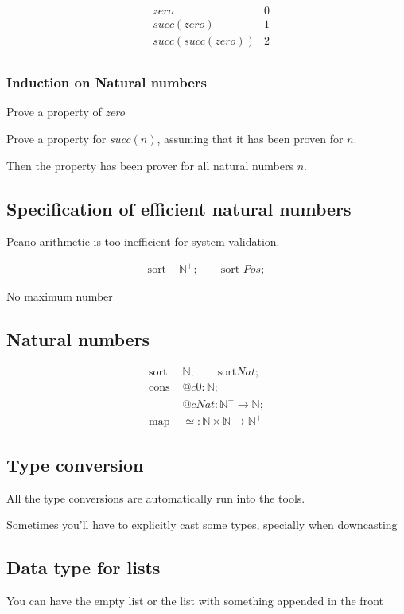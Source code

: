 \begin{align*}
  & zero & 0 \\
  & succ(zero) & 1 \\
  & succ(succ(zero)) & 2 \\
\end{align*}

\subsubsection{Induction on Natural numbers}
Prove a property of \emph{zero}

Prove a property for $succ(n)$, assuming that it has been proven for $n$.

Then the property has been prover for all natural numbers $n$.

\subsection{Specification of efficient natural numbers}

Peano arithmetic is too inefficient for system validation.

\begin{align*}
  \text{sort } & \mathbb{N}^+; \qquad \text{sort } Pos;
\end{align*}

No maximum number

\subsection{Natural numbers}

\begin{align*}
  \text{sort } & \mathbb{N}; \qquad \text{sort} Nat; \\
  \text{cons } & @c0: \mathbb{N}; \\
  & @cNat: \mathbb{N}^+ \rightarrow \mathbb{N}; \\
  \text{map } & \simeq: \mathbb{N} \times \mathbb{N} \rightarrow \mathbb{N}^+
\end{align*}

\subsection{Type conversion}

All the type conversions are automatically run into the tools.

Sometimes you'll have to explicitly cast some types, specially when downcasting 

\subsection{Data type for lists}

You can have the empty list or the list with something appended in the front





